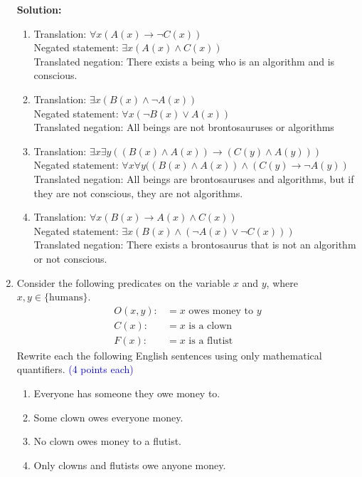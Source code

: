 \documentclass{article}
\newcommand{\pte}[1]{\textcolor{blue}{(#1 points each)}}
\newenvironment{solution}
{
\par
\color{blue}
\textbf{Solution:}
}
{
\par
}
\begin{document}
\begin{enumerate}
    \vspace{2mm}
    \begin{solution}
    \begin{enumerate}
        \item Translation: $\forall x (A(x) \rightarrow \neg C(x))$ \\
        Negated statement: $\exists x (A(x) \land C(x))$ \\
        Translated negation: There exists a being who is an algorithm and is conscious.
        \item Translation: $\exists x (B(x) \land \neg A(x))$ \\
        Negated statement: $\forall x (\neg B(x) \lor A(x))$ \\
        Translated negation: All beings are not brontosauruses or algorithms
        \item Translation: $\exists x \exists y ((B(x) \land A(x)) \rightarrow (C(y) \land A(y)))$ \\
        Negated statement: $\forall x \forall y ((B(x) \land A(x)) \land (C(y) \rightarrow \neg A(y))$ \\
        Translated negation: All beings are brontosauruses and algorithms, but if they are not conscious, they are not algorithms.
        \item Translation: $\forall x (B(x) \rightarrow A(x) \land C(x))$ \\
        Negated statement: $\exists x (B(x) \land (\neg A(x) \lor \neg C(x)))$\\
        Translated negation: There exists a brontosaurus that is not an algorithm or not conscious.
    \end{enumerate}
    \end{solution}
    
    \item Consider the following predicates on the variable $x$ and $y$, where $x,y \in \{\text{humans}\}$.
    \begin{align*}
        O(x,y) :&= \text{$x$ owes money to $y$}\\
        C(x) :&= \text{$x$ is a clown}\\
        F(x) :&= \text{$x$ is a flutist}
    \end{align*}
    Rewrite each the following English sentences using only mathematical quantifiers. \pte 4
    \begin{enumerate}
        \item Everyone has someone they owe money to.
        \item Some clown owes everyone money.
        \item No clown owes money to a flutist.
        \item Only clowns and flutists owe anyone money.
    \end{enumerate}


\end{enumerate}
\end{document}
